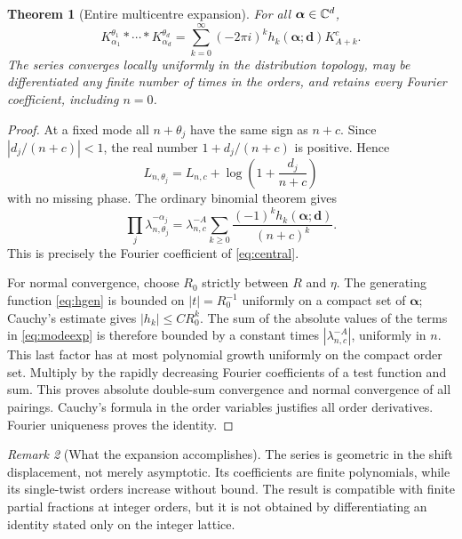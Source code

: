 \documentclass[11pt,a4paper]{article}
\numberwithin{equation}{section}
\newtheorem{theorem}{Theorem}[section]
\theoremstyle{definition}\newtheorem{definition}[theorem]{Definition}
\theoremstyle{remark}\newtheorem{remark}[theorem]{Remark}
\newcommand{\av}{\boldsymbol\alpha}\newcommand{\dv}{\boldsymbol d}
\begin{document}
\begin{theorem}[Entire multicentre expansion]\label{thm:central}
For all $\av\in\C^d$,
\begin{equation}
 K_{\alpha_1}^{\theta_1}*\cdots*K_{\alpha_d}^{\theta_d}
   =\sum_{k=0}^\infty(-2\pi i)^k
           h_k(\av;\dv)K_{A+k}^{c}.
 \label{eq:central}
\end{equation}
The series converges locally uniformly in the distribution topology,
may be differentiated any finite number of times in the orders, and
retains every Fourier coefficient, including $n=0$.
\end{theorem}
\begin{proof}
At a fixed mode all $n+\theta_j$ have the same sign as $n+c$. Since
$|d_j/(n+c)|<1$, the real number $1+d_j/(n+c)$ is positive. Hence
\[
 L_{n,\theta_j}=L_{n,c}+\log\left(1+\frac{d_j}{n+c}\right)
\]
with no missing phase. The ordinary binomial theorem gives
\begin{equation}
 \prod_j\lambda_{n,\theta_j}^{-\alpha_j}
 =\lambda_{n,c}^{-A}
     \sum_{k\ge0}\frac{(-1)^kh_k(\av;\dv)}{(n+c)^k}.
 \label{eq:modeexp}
\end{equation}
This is precisely the Fourier coefficient of \eqref{eq:central}.

For normal convergence, choose $R_0$ strictly between $R$ and $\eta$.
The generating function \eqref{eq:hgen} is bounded on $|t|=R_0^{-1}$
uniformly on a compact set of $\av$; Cauchy's estimate gives
$|h_k|\le C R_0^k$. The sum of the absolute values of the terms in
\eqref{eq:modeexp} is therefore bounded by a constant times
$|\lambda_{n,c}^{-A}|$, uniformly in $n$. This last factor has at most
polynomial growth uniformly on the compact order set. Multiply by the
rapidly decreasing Fourier coefficients of a test function and sum.
This proves absolute double-sum convergence and normal convergence of
all pairings. Cauchy's formula in the order variables justifies all
order derivatives. Fourier uniqueness proves the identity.
\end{proof}

\begin{remark}[What the expansion accomplishes]
The series is geometric in the shift displacement, not merely asymptotic.
Its coefficients are finite polynomials, while its single-twist orders
increase without bound. The result is compatible with finite partial
fractions at integer orders, but it is not obtained by differentiating
an identity stated only on the integer lattice.
\end{remark}
\end{document}
